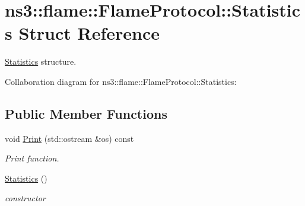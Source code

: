 \hypertarget{structns3_1_1flame_1_1FlameProtocol_1_1Statistics}{}\section{ns3\+:\+:flame\+:\+:Flame\+Protocol\+:\+:Statistics Struct Reference}
\label{structns3_1_1flame_1_1FlameProtocol_1_1Statistics}


\hyperlink{structns3_1_1flame_1_1FlameProtocol_1_1Statistics}{Statistics} structure.  




Collaboration diagram for ns3\+:\+:flame\+:\+:Flame\+Protocol\+:\+:Statistics\+:
\subsection*{Public Member Functions}
\begin{DoxyCompactItemize}
\item 
void \hyperlink{structns3_1_1flame_1_1FlameProtocol_1_1Statistics_a29ffb9207fe8b18c71f238f2a9a0a6f6}{Print} (std\+::ostream \&os) const 
\begin{DoxyCompactList}\small\item\em Print function. \end{DoxyCompactList}\item 
\hyperlink{structns3_1_1flame_1_1FlameProtocol_1_1Statistics_a292c3813a541b8d992efbfbe96f7106f}{Statistics} ()
\begin{DoxyCompactList}\small\item\em constructor \end{DoxyCompactList}\end{DoxyCompactItemize}
